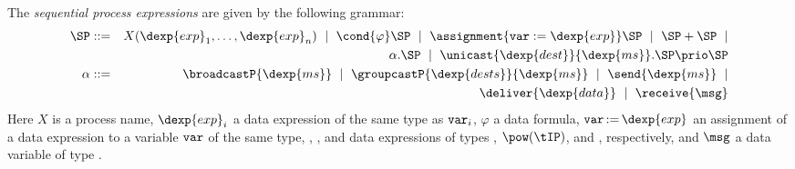 \documentclass[envcountsame,envcountsect,orivec,runningheads]{llncs}
\renewcommand{\keyw}[1]{\ensuremath{{\tt #1}}}
\begin{document}
The \emph{sequential process expressions} are given by the following grammar:
\begin{eqnarray*}
\SP &::=& X(\dexp{exp}_1,\ldots,\dexp{exp}_n) ~\mid~ \cond{\varphi}\SP ~\mid~ \assignment{\keyw{var}:=\dexp{exp}} \SP~\mid~ \SP+\SP ~\mid\\
     &&\alpha.\SP ~\mid~ \unicast{\dexp{dest}}{\dexp{ms}}.\SP \prio \SP \\
\alpha &::=&
  \broadcastP{\dexp{ms}} ~\mid~ \groupcastP{\dexp{dests}}{\dexp{ms}}
  ~\mid~ \send{\dexp{ms}} ~\mid\\
  &&\deliver{\dexp{data}} ~\mid~\receive{\msg}
\end{eqnarray*}
Here $X$ is a process name, $\dexp{exp}_i$ a data expression of the
same type as $\keyw{var}_i$, $\varphi$ a data formula,
$\keyw{var}\mathop{:=}\dexp{exp}$ an assignment of a data expression
 to a variable \keyw{var} of the same type, ,
,  and  data expressions of types
{\tIP}, $\pow(\tIP)$, {\tDATA} and {\tMSG}, respectively, and $\msg$ a
data variable of type \tMSG.
\end{document}
